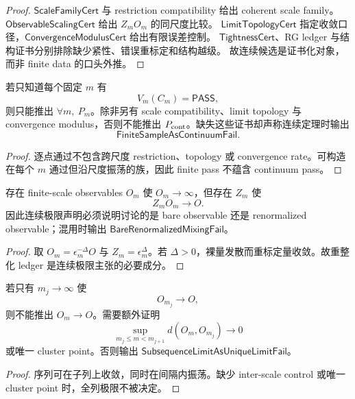\begin{proof}
\(\mathsf{ScaleFamilyCert}\) 与 restriction compatibility 给出 coherent scale family。
\(\mathsf{ObservableScalingCert}\) 给出 \(Z_mO_m\) 的同尺度比较。
\(\mathsf{LimitTopologyCert}\) 指定收敛口径，\(\mathsf{ConvergenceModulusCert}\) 给出有限误差控制。
\(\mathsf{TightnessCert}\)、RG ledger 与结构证书分别排除缺少紧性、错误重标定和结构越级。
故连续候选是证书化对象，而非 finite data 的口头外推。
\end{proof}

\begin{theorem}[有限验证不推出连续收敛]\label{thm:typed-address-biaxial-completion-finite-verification-not-continuum}
若只知道每个固定 \(m\) 有
\[
V_m(C_m)=\mathsf{PASS},
\]
则只能推出 \(\forall m,\ P_m\)。除非另有 scale compatibility、limit topology 与 convergence modulus，否则不能推出 \(P_{\rm cont}\)。缺失这些证书却声称连续定理时输出
\[
\boxed{\mathsf{FiniteSampleAsContinuumFail}.}
\]
\end{theorem}

\begin{proof}
逐点通过不包含跨尺度 restriction、topology 或 convergence rate。可构造在每个 \(m\) 通过但沿尺度振荡的族，因此 finite pass 不蕴含 continuum pass。
\end{proof}

\begin{theorem}[裸量不必收敛]\label{thm:typed-address-biaxial-completion-renormalization-necessity}
存在 finite-scale observables \(O_m\) 使 \(O_m\to\infty\)，但存在 \(Z_m\) 使
\[
Z_mO_m\to O.
\]
因此连续极限声明必须说明讨论的是 bare observable 还是 renormalized observable；混用时输出 \(\mathsf{BareRenormalizedMixingFail}\)。
\end{theorem}

\begin{proof}
取 \(O_m=\epsilon_m^{-\Delta}O\) 与 \(Z_m=\epsilon_m^\Delta\)。若 \(\Delta>0\)，裸量发散而重标定量收敛。故重整化 ledger 是连续极限主张的必要成分。
\end{proof}

\begin{theorem}[子列收敛不足]\label{thm:typed-address-biaxial-completion-subsequence-not-full-limit}
若只有 \(m_j\to\infty\) 使
\[
O_{m_j}\to O,
\]
则不能推出 \(O_m\to O\)。需要额外证明
\[
\boxed{
\sup_{m_j\le m<m_{j+1}}d(O_m,O_{m_j})\to0
}
\]
或唯一 cluster point。否则输出 \(\mathsf{SubsequenceLimitAsUniqueLimitFail}\)。
\end{theorem}

\begin{proof}
序列可在子列上收敛，同时在间隔内振荡。缺少 inter-scale control 或唯一 cluster point 时，全列极限不被决定。
\end{proof}

